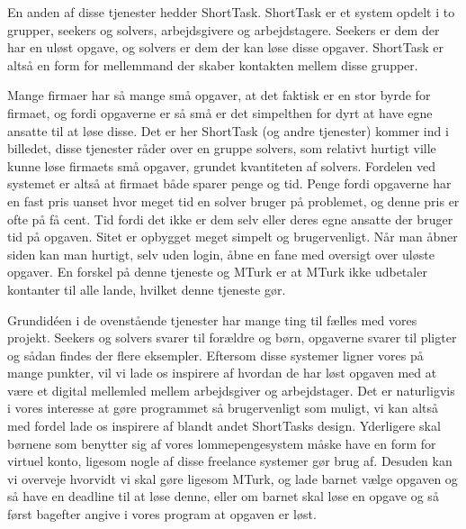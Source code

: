 En anden af disse tjenester hedder ShortTask. ShortTask er et system opdelt i to grupper, seekers og solvers, arbejdsgivere og arbejdstagere. Seekers er dem der har en uløst opgave, og solvers er dem der kan løse disse opgaver. ShortTask er altså en form for mellemmand der skaber kontakten mellem disse grupper.

Mange firmaer har så mange små opgaver, at det faktisk er en stor byrde for firmaet, og fordi opgaverne er så små er det simpelthen for dyrt at have egne ansatte til at løse disse. Det er her ShortTask (og andre tjenester) kommer ind i billedet, disse tjenester råder over en gruppe solvers, som relativt hurtigt ville kunne løse firmaets små opgaver, grundet kvantiteten af solvers. Fordelen ved systemet er altså at firmaet både sparer penge og tid. Penge fordi opgaverne har en fast pris uanset hvor meget tid en solver bruger på problemet, og denne pris er ofte på få cent. Tid fordi det ikke er dem selv eller deres egne ansatte der bruger tid på opgaven. Sitet er opbygget meget simpelt og brugervenligt. Når man åbner siden kan man hurtigt, selv uden login, åbne en fane med oversigt over uløste opgaver. En forskel på denne tjeneste og MTurk er at MTurk ikke udbetaler kontanter til alle lande, hvilket denne tjeneste gør. \cite{ShortTask}

Grundidéen i de ovenstående tjenester har mange ting til fælles med vores projekt. Seekers og solvers svarer til forældre og børn, opgaverne svarer til pligter og sådan findes der flere eksempler. Eftersom disse systemer ligner vores på mange punkter, vil vi lade os inspirere af hvordan de har løst opgaven med at være et digital mellemled mellem arbejdsgiver og arbejdstager. Det er naturligvis i vores interesse at gøre programmet så brugervenligt som muligt, vi kan altså med fordel lade os inspirere af blandt andet ShortTasks design. Yderligere skal børnene som benytter sig af vores lommepengesystem måske have en form for virtuel konto, ligesom nogle af disse freelance systemer gør brug af. Desuden kan vi overveje hvorvidt vi skal gøre ligesom MTurk, og lade barnet vælge opgaven og så have en deadline til at løse denne, eller om barnet skal løse en opgave og så først bagefter angive i vores program at opgaven er løst.


